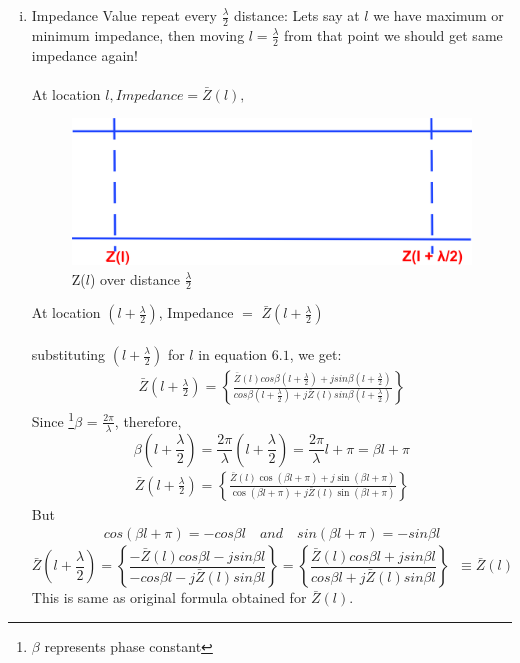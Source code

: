 \begin{enumerate}[(i)]
\item Impedance Value repeat every $\frac{\lambda}{2}$ distance: Lets say at $l$ we have maximum or minimum impedance, then moving $l=\frac{\lambda}{2}$ from that point we should get same impedance again!\\\\
At location $l , Impedance =\bar{Z}(l),$
\begin{figure}[h]
\centering
\includegraphics[width=0.7\linewidth]{./graphics/astyui;f}
\caption{Z($l$) over distance $\frac{\lambda}{2}$}
\label{fig:astyuif}
\end{figure}

At location ${(l+\frac{\lambda}{2})}$, Impedance  $=$ $\bar{Z}(l+\frac{\lambda}{2})$\\\\
substituting ${(l+\frac{\lambda}{2})}$ for $l$ in equation $6.1$, we get: 
\begin{align*}
\bar{Z}(l+\frac{\lambda}{2}) = \left\lbrace \frac{\bar{Z}(l)cos\beta (l+\frac{\lambda}{2}) + jsin\beta (l+\frac{\lambda}{2})}{cos\beta (l+\frac{\lambda}{2}) + j\bar{Z}(l)sin\beta (l+\frac{\lambda}{2})}\right\rbrace 
\end{align*}
Since \footnote{$\beta$ represents phase constant}$\beta$ = $ \frac{2\pi}{\lambda}$, therefore,
\begin{dmath*}
\beta(l+\frac{\lambda}{2})=\frac{2\pi}{\lambda}(l+\frac{\lambda}{2})=\frac{2\pi}{\lambda}l+\pi=\beta l+\pi
\end{dmath*}
\begin{align*}
\bar{Z}(l+\frac{\lambda}{2}) = \left\lbrace \frac{\bar{Z}(l)\cos(\beta l+\pi) + j\sin(\beta l+\pi)}{\cos(\beta l+\pi) + j\bar{Z}(l)\sin(\beta l+\pi)}\right\rbrace 
\end{align*}
But 
\begin{align*} 
cos(\beta l+\pi)=-cos\beta l \quad and \quad sin(\beta l+\pi)=-sin\beta l
\end{align*}
\begin{dmath*}
\bar{Z}(l+\frac{\lambda}{2})=\left\lbrace \frac{-\bar{Z}(l)cos\beta l - jsin\beta l}{-cos\beta l - j\bar{Z}(l)sin\beta l}\right\rbrace = \left\lbrace \frac{\bar{Z}(l)cos\beta l + jsin\beta l}{cos\beta l + j\bar{Z}(l)sin\beta l}\right\rbrace\;\;\equiv \bar{Z}(l)
\end{dmath*} 
This is same as original formula obtained for $\bar{Z}(l)$.


\end{enumerate}
